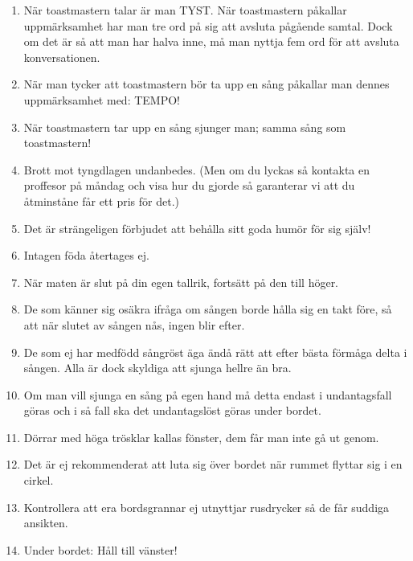 \documentclass[twoside, openright]{report}
\begin{document}
\begin{enumerate}

\item När toastmastern talar är man TYST. När toastmastern påkallar uppmärksamhet har man tre ord på sig att avsluta pågående samtal. Dock om det är så att man har halva inne, må man nyttja fem ord för att avsluta konversationen.

\item När man tycker att toastmastern bör ta upp en sång påkallar man dennes
uppmärksamhet med: TEMPO!

\item När toastmastern tar upp en sång sjunger man; samma sång som toastmastern!

\item Brott mot tyngdlagen undanbedes. (Men om du lyckas så kontakta en proffesor på måndag och visa hur du gjorde så garanterar vi att du åtminståne får ett pris för det.)

\item Det är strängeligen förbjudet att behålla sitt goda humör för sig själv!

\item Intagen föda återtages ej.

\item När maten är slut på din egen tallrik, fortsätt på den till höger.

\item De som känner sig osäkra ifråga om sången borde hålla sig en takt före, så att när slutet av sången nås, ingen blir efter.

\item De som ej har medfödd sångröst äga ändå rätt att efter bästa förmåga delta i sången. Alla är dock skyldiga att sjunga hellre än bra.

\item Om man vill sjunga en sång på egen hand må detta endast i undantagsfall göras och i så fall ska det undantagslöst göras under bordet.

\item Dörrar med höga trösklar kallas fönster, dem får man inte gå ut genom.

\item Det är ej rekommenderat att luta sig över bordet när rummet flyttar sig i en cirkel.

\item Kontrollera att era bordsgrannar ej utnyttjar rusdrycker så de får suddiga ansikten.

\item Under bordet: Håll till vänster!

\end{enumerate}
\end{document}

